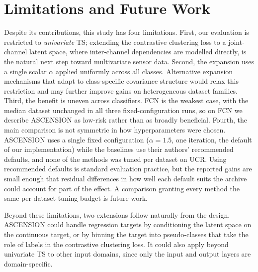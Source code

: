 \section{Limitations and Future Work}
\label{sec:limitations}

Despite its contributions, this study has four limitations. First,
our evaluation is restricted to \emph{univariate} TS;
extending the contrastive clustering loss to a joint-channel latent
space, where inter-channel dependencies are modelled directly, is
the natural next step toward multivariate sensor data. Second,
the expansion uses a single scalar $\alpha$ applied uniformly across all
classes. Alternative expansion mechanisms that adapt to class-specific
covariance structure would relax this restriction and may further
improve gains on heterogeneous dataset families.
Third, the benefit is uneven across classifiers. FCN is the
weakest case, with the median dataset unchanged in all three
fixed-configuration runs, so on FCN we describe ASCENSION as
low-risk rather than as broadly beneficial.
Fourth, the main comparison is not symmetric in how
hyperparameters were chosen. ASCENSION uses a single fixed
configuration ($\alpha = 1.5$, one iteration, the default of our
implementation) while the baselines
use their authors' recommended defaults, and none of the methods
was tuned per dataset on UCR. Using recommended defaults is
standard evaluation practice, but the reported gains are small
enough that residual differences in how well each default suits
the archive could account for part of the effect. A comparison
granting every method the same per-dataset tuning budget is future
work.

Beyond these limitations, two extensions follow naturally from the
design. ASCENSION could handle regression targets by conditioning
the latent space on the continuous target, or by binning the
target into pseudo-classes that take the role of labels in the
contrastive clustering loss. It could also apply beyond univariate
TS to other input domains, since only the input and output layers
are domain-specific.